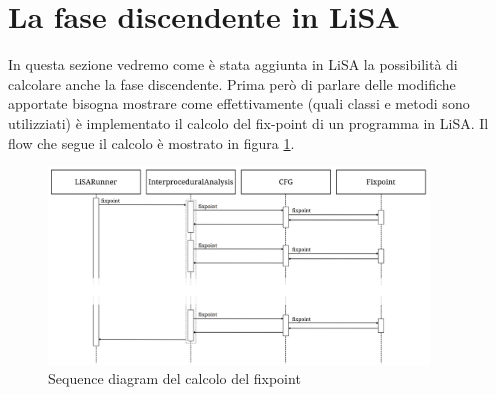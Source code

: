 \section{La fase discendente in LiSA}
In questa sezione vedremo come è stata aggiunta in LiSA la possibilità di calcolare anche la fase discendente. Prima però di parlare delle modifiche apportate bisogna mostrare come effettivamente (quali classi e metodi sono utilizziati) è implementato il calcolo del fix-point di un programma in LiSA. Il flow che segue il calcolo è mostrato in figura \ref{fig:flowFixpoint}. 
\begin{figure}[ht]
	\centering
	\includegraphics[width=0.9\textwidth]{Immagini/flowFixpoint.png}
	\caption{Sequence diagram del calcolo del fixpoint}
	\label{fig:flowFixpoint}
\end{figure}

